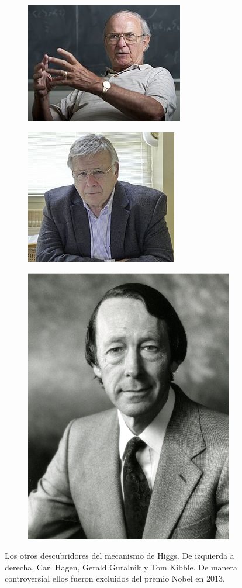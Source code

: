 \begin{figure}
\centering
\begin{subfigure}{0.31\textwidth}
	\includegraphics[scale=2]{images/hagen.jpg}
\end{subfigure}	
\begin{subfigure}{0.31\textwidth}
	\includegraphics[scale=0.5]{images/guralnik.jpg}
\end{subfigure}	
\begin{subfigure}{0.31\textwidth}
	\includegraphics[scale=0.25]{images/kibble.png}
\end{subfigure}	

	\caption{Los otros descubridores del mecanismo de Higgs. De izquierda a derecha, Carl Hagen, Gerald Guralnik y Tom Kibble. De manera controversial ellos fueron excluidos del premio Nobel en 2013.} 
\end{figure}
